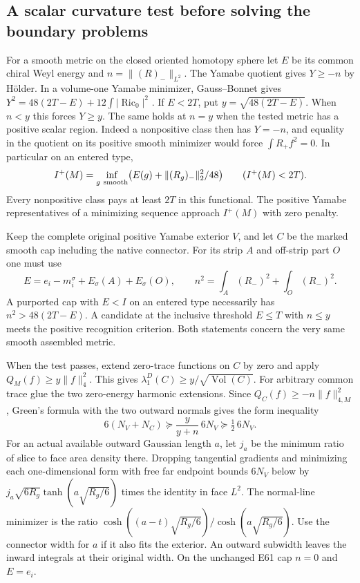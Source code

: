 \documentclass[11pt,letterpaper]{article}
\numberwithin{equation}{section}
\DeclareMathOperator{\Ric}{Ric}
\begin{document}
\subsection{A scalar curvature test before solving the boundary problems}
For a smooth metric on the closed oriented homotopy sphere let \(E\)
be its common chiral Weyl energy and \(n=\|(R)_-\|_{L^2}\).
The Yamabe quotient gives \(Y\ge -n\) by H\"older. In a volume-one
Yamabe minimizer, Gauss--Bonnet gives
\(Y^2=48(2T-E)+12\int|\Ric_0|^2\) \cite{LeeParker1987Yamabe}.
If \(E<2T\), put \(y=\sqrt{48(2T-E)}\). When \(n<y\) this forces
\(Y\ge y\). The same holds at \(n=y\) when the tested metric has a
positive scalar region. Indeed a nonpositive class then has \(Y=-n\),
and equality in the quotient on its positive smooth minimizer would
force \(\int R_+ f^2=0\). In particular on an entered type,
\[
 I^+(M)=\inf_{g\ {\rm smooth}}\bigl(E(g)+\|(R_g)_-\|_2^2/48\bigr)
 \qquad (I^+(M)<2T).
\]
Every nonpositive class pays at least \(2T\) in this functional.
The positive Yamabe representatives of a minimizing sequence
approach \(I^+(M)\) with zero penalty.

Keep the complete original positive Yamabe exterior \(V\), and let
\(C\) be the marked smooth cap including the native connector.
For its strip \(A\) and off-strip part \(O\) one must use
\[
 E=e_i-m_i^\sigma+E_\sigma(A)+E_\sigma(O),\qquad
 n^2=\int_A(R_- )^2+\int_O(R_-)^2 .
\]
A purported cap with \(E<I\) on an entered type necessarily has
\(n^2>48(2T-E)\). A candidate at the inclusive threshold \(E\le T\)
with \(n\le y\) meets the positive recognition criterion. Both
statements concern the very same smooth assembled metric.

When the test passes, extend zero-trace functions on \(C\) by zero
and apply \(Q_M(f)\ge y\|f\|_4^2\). This gives
\(\lambda_1^D(C)\ge y/\sqrt{\operatorname{Vol}(C)}\).
For arbitrary common trace glue the two zero-energy harmonic
extensions. Since \(Q_C(f)\ge-n\|f\|_{4,M}^2\), Green's formula
with the two outward normals gives the form inequality
\[
 6(N_V+N_C)\succeq \frac{y}{y+n}\,6N_V\succeq\tfrac12\,6N_V .
\]
For an actual available outward Gaussian length \(a\), let \(j_a\)
be the minimum ratio of slice to face area density there. Dropping
tangential gradients and minimizing each one-dimensional form
with free far endpoint bounds \(6N_V\) below by
\(j_a\sqrt{6R_g}\tanh(a\sqrt{R_g/6})\) times the identity in
face \(L^2\). The normal-line minimizer is the ratio
\(\cosh((a-t)\sqrt{R_g/6})/\cosh(a\sqrt{R_g/6})\).
Use the connector width for \(a\) if it also fits the exterior.
An outward subwidth leaves the inward integrals at their original
width. On the unchanged E61 cap \(n=0\) and \(E=e_i\).
\end{document}
